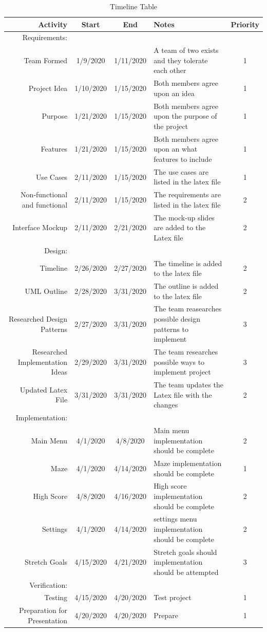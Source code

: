 \documentclass[10pt,conference,onecolumn,compsoc]{IEEEtran}
\begin{document}
\begin{table}
\centering
\begin{tabular}{|r|c|c|l|c|}
\hline
 Activity & Start & End & Notes & Priority \\
\hline \hline
Requirements: \\
\hline \hline

Team Formed & 1/9/2020 & 1/11/2020 & A team of two exists and they tolerate each other & 1\\
Project Idea & 1/10/2020 & 1/15/2020 & Both members agree upon an idea & 1\\
Purpose & 1/21/2020 & 1/15/2020 & Both members agree upon the purpose of the project & 1\\
Features & 1/21/2020 & 1/15/2020 & Both members agree upon an what features to include& 1\\
Use Cases & 2/11/2020 & 1/15/2020 & The use cases are listed in the latex file & 1\\
Non-functional and functional & 2/11/2020 & 1/15/2020 & The requirements are listed in the latex file & 2\\
Interface Mockup & 2/11/2020 & 2/21/2020 & The mock-up slides are added to the Latex file & 2\\
\hline \hline
Design: \\
\hline \hline 
Timeline & 2/26/2020 & 2/27/2020 & The timeline is added to the latex file & 2\\
UML Outline & 2/28/2020 & 3/31/2020 & The outline is added to the latex file & 2\\
Researched Design Patterns& 2/27/2020& 3/31/2020 & The team reasearches possible design patterns to implement & 3\\
Researched Implementation Ideas & 2/29/2020& 3/31/2020 & The team researches possible ways to implement project & 3\\
Updated Latex File& 3/31/2020 & 3/31/2020 & The team updates the Latex file with the changes&2\\
\hline \hline
Implementation: \\
\hline \hline 
Main Menu &4/1/2020& 4/8/2020& Main menu implementation should be complete& 2\\
Maze&4/1/2020 & 4/14/2020 & Maze implementation should be complete& 1\\
High Score& 4/8/2020&4/16/2020& High score implementation should be complete& 2\\
Settings&4/1/2020& 4/14/2020& settings menu implementation should be complete& 2\\
Stretch Goals& 4/15/2020&4/21/2020& Stretch goals should implementation should be attempted & 3\\
\hline \hline
Verification: \\
\hline \hline 
Testing & 4/15/2020&4/20/2020&Test project&1\\
Preparation for Presentation & 4/20/2020&4/20/2020& Prepare&1\\
\hline
\end{tabular}
\caption{Timeline Table}
\label{tab:timeline}
\end{table}
\clearpage
\end{document}
